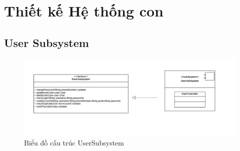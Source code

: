 \section{Thiết kế Hệ thống con}
\subsection{User Subsystem}
\begin{figure}[H]
    \centering
    \includegraphics[width=\textwidth]{img3.5/user/cauTruc(UserSst).png} 
    \caption{Biểu đồ cấu trúc UserSubsystem}
\end{figure}

